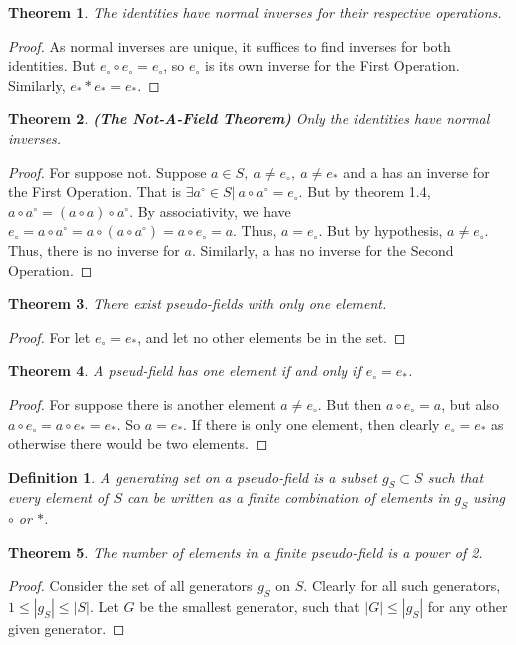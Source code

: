 \documentclass[oneside]{book}
\theoremstyle{mystyle}
\newtheorem{theorem}{Theorem}[section]
\newtheorem{definition}{Definition}[section]
\begin{document}
\begin{theorem} The identities have normal inverses for their respective operations.
\end{theorem}
\begin{proof} As normal inverses are unique, it suffices to find inverses for both identities. But $e_{\circ}\circ e_{\circ}=e_{\circ}$, so $e_{\circ}$ is its own inverse for the First Operation. Similarly, $e_{*}*e_{*}=e_{*}$.
\end{proof}
\begin{theorem} \textbf{(The Not-A-Field Theorem)} Only the identities have normal inverses.
\end{theorem}
\begin{proof} For suppose not. Suppose $a\in S,\ a\ne e_{\circ},\ a\ne e_{*}$ and a has an inverse for the First Operation. That is $\exists a^{\circ}\in S|\ a\circ a^{\circ}=e_{\circ}$. But by theorem 1.4, $a\circ a^{\circ}=(a\circ a)\circ a^{\circ}$. By associativity, we have $e_{\circ}=a\circ a^{\circ} = a\circ (a\circ a^{\circ})=a\circ e_{\circ}=a$. Thus, $a=e_{\circ}$. But by hypothesis, $a\ne e_{\circ}$. Thus, there is no inverse for $a$. Similarly, a has no inverse for the Second Operation.
\end{proof}
\begin{theorem}
There exist pseudo-fields with only one element.
\end{theorem}
\begin{proof}
For let $e_{\circ} = e_{*}$, and let no other elements be in the set. 
\end{proof}
\begin{theorem}
A pseud-field has one element if and only if $e_{\circ} = e_{*}$.
\end{theorem}
\begin{proof}
For suppose there is another element $a \ne e_{\circ}$. But then $a \circ e_{\circ} = a$, but also $a \circ e_{\circ} = a \circ e_{*} = e_{*}$. So $a = e_{*}$. If there is only one element, then clearly $e_{\circ} = e_{*}$ as otherwise there would be two elements.
\end{proof}
\begin{definition} A generating set on a pseudo-field is a subset $g_S \subset S$ such that every element of $S$ can be written as a finite combination of elements in $g_S$ using $\circ$ or $*$.
\end{definition}
\begin{theorem}
The number of elements in a finite pseudo-field is a power of 2.
\end{theorem}
\begin{proof}
Consider the set of all generators $g_S$ on $S$. Clearly for all such generators, $1\leq |g_S|\leq |S|$. Let $G$ be the smallest generator, such that $|G| \leq |g_S|$ for any other given generator. 
\end{proof}
%
\end{document}
